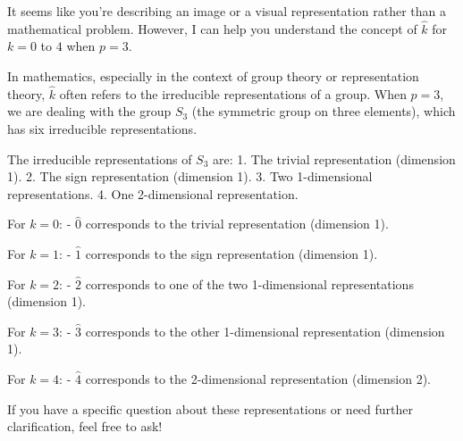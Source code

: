 It seems like you're describing an image or a visual representation rather than a mathematical problem. However, I can help you understand the concept of \( \hat{k} \) for \( k = 0 \) to \( 4 \) when \( p = 3 \).

In mathematics, especially in the context of group theory or representation theory, \( \hat{k} \) often refers to the irreducible representations of a group. When \( p = 3 \), we are dealing with the group \( S_3 \) (the symmetric group on three elements), which has six irreducible representations.

The irreducible representations of \( S_3 \) are:
1. The trivial representation (dimension 1).
2. The sign representation (dimension 1).
3. Two 1-dimensional representations.
4. One 2-dimensional representation.

For \( k = 0 \):
- \( \hat{0} \) corresponds to the trivial representation (dimension 1).

For \( k = 1 \):
- \( \hat{1} \) corresponds to the sign representation (dimension 1).

For \( k = 2 \):
- \( \hat{2} \) corresponds to one of the two 1-dimensional representations (dimension 1).

For \( k = 3 \):
- \( \hat{3} \) corresponds to the other 1-dimensional representation (dimension 1).

For \( k = 4 \):
- \( \hat{4} \) corresponds to the 2-dimensional representation (dimension 2).

If you have a specific question about these representations or need further clarification, feel free to ask!